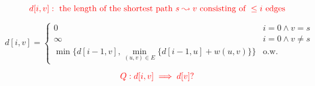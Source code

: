 \begin{frame}[noframenumbering]{}
  \begin{center}
  \end{center}

  \pause
  \[
    \textcolor{red}{d[i, v]: \text{ the length of the shortest path } s \leadsto v \text{ consisting of } \le i \text{ edges}}
  \]

  \pause
  \[
    d[i,v] = \begin{cases}
      0 & i = 0 \land v = s \\
      \infty & i = 0 \land v \neq s \\
      \min\Big\{ d[i-1, v], \min\limits_{(u,v) \in E} \big\{ d[i-1, u] + w(u,v) \big\} \Big\} & \text{o.w.}
    \end{cases}
  \]
\end{frame}

\begin{frame}[noframenumbering]{}
  

  \pause
  \[
    \textcolor{red}{Q: d[i, v] \implies d[v]?}
  \]
\end{frame}
